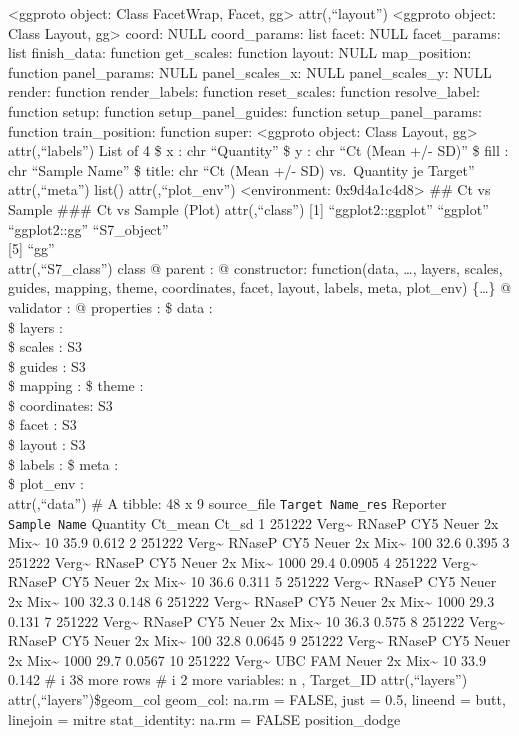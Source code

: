 \documentclass[
]{article}
\begin{document}
\textless ggproto object: Class FacetWrap, Facet, gg\textgreater{}
attr(,``layout'') \textless ggproto object: Class Layout,
gg\textgreater{} coord: NULL coord\_params: list facet: NULL
facet\_params: list finish\_data: function get\_scales: function layout:
NULL map\_position: function panel\_params: NULL panel\_scales\_x: NULL
panel\_scales\_y: NULL render: function render\_labels: function
reset\_scales: function resolve\_label: function setup: function
setup\_panel\_guides: function setup\_panel\_params: function
train\_position: function super: \textless ggproto object: Class Layout,
gg\textgreater{} attr(,``labels'') List of 4 \$ x : chr ``Quantity'' \$
y : chr ``Ct (Mean +/- SD)'' \$ fill : chr ``Sample Name'' \$ title: chr
``Ct (Mean +/- SD) vs.~Quantity je Target'' attr(,``meta'') list()
attr(,``plot\_env'') \textless environment: 0x9d4a1c4d8\textgreater{}
\n\#\# Ct vs Sample \n\n\#\#\# Ct vs Sample (Plot) \n\n attr(,``class'')
{[}1{]} ``ggplot2::ggplot'' ``ggplot'' ``ggplot2::gg'' ``S7\_object''\\
{[}5{]} ``gg''\\
attr(,``S7\_class'') class @ parent : @ constructor: function(data,
\ldots, layers, scales, guides, mapping, theme, coordinates, facet,
layout, labels, meta, plot\_env) \{\ldots\} @ validator : @ properties :
\$ data : \\
\$ layers : \\
\$ scales : S3\\
\$ guides : S3\\
\$ mapping : \$ theme : \\
\$ coordinates: S3\\
\$ facet : S3\\
\$ layout : S3\\
\$ labels : \$ meta : \\
\$ plot\_env : \\
attr(,``data'') \# A tibble: 48 x 9 source\_file
\texttt{Target\ Name\_res} Reporter \texttt{Sample\ Name} Quantity
Ct\_mean Ct\_sd 1 251222 Verg\textasciitilde{} RNaseP CY5 Neuer 2x
Mix\textasciitilde{} 10 35.9 0.612 2 251222 Verg\textasciitilde{} RNaseP
CY5 Neuer 2x Mix\textasciitilde{} 100 32.6 0.395 3 251222
Verg\textasciitilde{} RNaseP CY5 Neuer 2x Mix\textasciitilde{} 1000 29.4
0.0905 4 251222 Verg\textasciitilde{} RNaseP CY5 Neuer 2x
Mix\textasciitilde{} 10 36.6 0.311 5 251222 Verg\textasciitilde{} RNaseP
CY5 Neuer 2x Mix\textasciitilde{} 100 32.3 0.148 6 251222
Verg\textasciitilde{} RNaseP CY5 Neuer 2x Mix\textasciitilde{} 1000 29.3
0.131 7 251222 Verg\textasciitilde{} RNaseP CY5 Neuer 2x
Mix\textasciitilde{} 10 36.3 0.575 8 251222 Verg\textasciitilde{} RNaseP
CY5 Neuer 2x Mix\textasciitilde{} 100 32.8 0.0645 9 251222
Verg\textasciitilde{} RNaseP CY5 Neuer 2x Mix\textasciitilde{} 1000 29.7
0.0567 10 251222 Verg\textasciitilde{} UBC FAM Neuer 2x
Mix\textasciitilde{} 10 33.9 0.142 \# i 38 more rows \# i 2 more
variables: n , Target\_ID attr(,``layers'') attr(,``layers'')\$geom\_col
geom\_col: na.rm = FALSE, just = 0.5, lineend = butt, linejoin = mitre
stat\_identity: na.rm = FALSE position\_dodge
\end{document}
